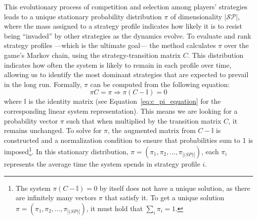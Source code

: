         \noindent
        This evolutionary process of competition and selection among players' strategies leads to a unique stationary probability distribution $\pi$ of dimensionality $|\mathcal{SP}|$, where the mass assigned to a strategy profile indicates how likely it is to resist being ``invaded'' by other strategies as the dynamics evolve. To evaluate and rank strategy profiles —which is the ultimate goal— the method calculates $\pi$ over the game's Markov chain, using the strategy-transition matrix $C$. This distribution indicates how often the system is likely to remain in each profile over time, allowing us to identify the most dominant strategies that are expected to prevail in the long run. Formally, $\pi$ can be computed from the following equation:
        \begin{equation}
            \pi C = \pi \Rightarrow \pi (C - \mathbb{I}) = 0 
            \label{eq:stationary_distribution}
        \end{equation}
        where $\mathbb{I}$ is the identity matrix (see Equation~\ref{eq:c_pi_equation} for the corresponding linear system representation). This means we are looking for a probability vector $\pi$ such that when multiplied by the transition matrix $C$, it remains unchanged. To solve for $\pi$, the augmented matrix from $C - \mathbb{I}$ is constructed and a normalization condition to ensure that probabilities sum to 1 is imposed\footnote{The system $\pi(C - \mathbb{I}) = 0$ by itself does not have a unique solution, as there are infinitely many vectors $\pi$ that satisfy it. To get a unique solution $\pi=(\pi_1,\pi_2,..., \allowbreak\pi_{|\mathcal(SP)|})$, it must hold that $\sum_{i} \pi_i = 1$.}. In this stationary distribution, $\pi=(\pi_1,\pi_2,..., \pi_{|\mathcal(SP)|})$, each $\pi_i$ represents the average time the system spends in strategy profile $i$.
